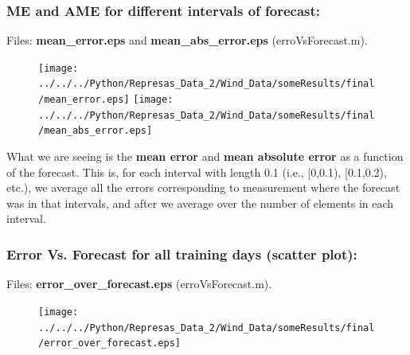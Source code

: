 \documentclass[aspectratio=169]{beamer}\usepackage[utf8]{inputenc}
\begin{document}

\begin{frame}\frametitle{ME and AME for different intervals of forecast:}
Files: \textbf{mean\_error.eps} and \textbf{mean\_abs\_error.eps} (erroVsForecast.m).\\
\begin{figure}[ht!]
\centering
\texttt{[image: ../../../Python/Represas\_Data\_2/Wind\_Data/someResults/final/mean\_error.eps]}\quad\quad
\texttt{[image: ../../../Python/Represas\_Data\_2/Wind\_Data/someResults/final/mean\_abs\_error.eps]}
\end{figure}
{\footnotesize What we are seeing is the \textbf{mean error} and \textbf{mean absolute error} as a function of the forecast. This is, for each interval with length 0.1 (i.e., [0,0.1), [0.1,0.2), etc.), we average all the errors corresponding to measurement where the forecast was in that intervals, and after we average over the number of elements in each interval.}

\end{frame}


\begin{frame}\frametitle{Error Vs. Forecast for all training days (scatter plot):}
Files: \textbf{error\_over\_forecast.eps} (erroVsForecast.m).

\begin{figure}[ht!]
\centering
\texttt{[image: ../../../Python/Represas\_Data\_2/Wind\_Data/someResults/final/error\_over\_forecast.eps]}
\end{figure}

\end{frame}

\end{document}
